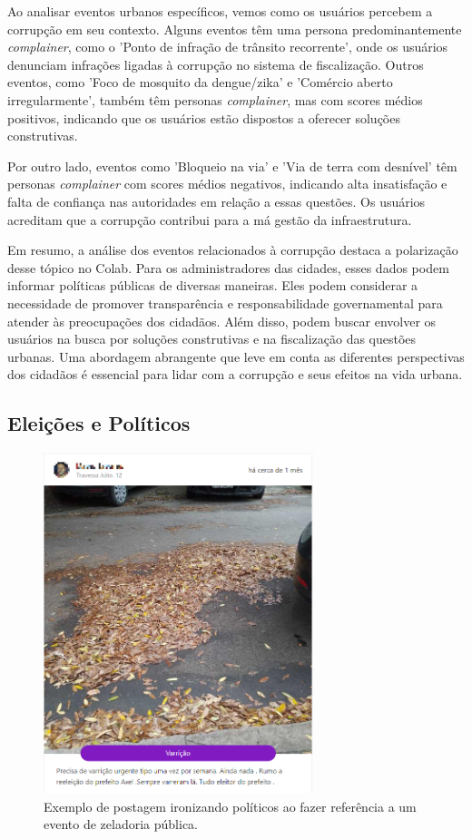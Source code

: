 Ao analisar eventos urbanos específicos, vemos como os usuários percebem a corrupção em seu contexto. Alguns eventos têm uma persona predominantemente \textit{complainer}, como o 'Ponto de infração de trânsito recorrente', onde os usuários denunciam infrações ligadas à corrupção no sistema de fiscalização. Outros eventos, como 'Foco de mosquito da dengue/zika' e 'Comércio aberto irregularmente', também têm personas \textit{complainer}, mas com scores médios positivos, indicando que os usuários estão dispostos a oferecer soluções construtivas.

Por outro lado, eventos como 'Bloqueio na via' e 'Via de terra com desnível' têm personas \textit{complainer} com scores médios negativos, indicando alta insatisfação e falta de confiança nas autoridades em relação a essas questões. Os usuários acreditam que a corrupção contribui para a má gestão da infraestrutura.

Em resumo, a análise dos eventos relacionados à corrupção destaca a polarização desse tópico no Colab. Para os administradores das cidades, esses dados podem informar políticas públicas de diversas maneiras. Eles podem considerar a necessidade de promover transparência e responsabilidade governamental para atender às preocupações dos cidadãos. Além disso, podem buscar envolver os usuários na busca por soluções construtivas e na fiscalização das questões urbanas. Uma abordagem abrangente que leve em conta as diferentes perspectivas dos cidadãos é essencial para lidar com a corrupção e seus efeitos na vida urbana.

\subsection{Eleições e Políticos}

\begin{figure}[htb]
	\centering
	\includegraphics[width=0.7\textwidth]{images/colab_posts_polititians.png}
	\caption{Exemplo de postagem ironizando políticos ao fazer referência a um evento de zeladoria pública.}
	\label{fig:colab_posts_polititians}
\end{figure}

